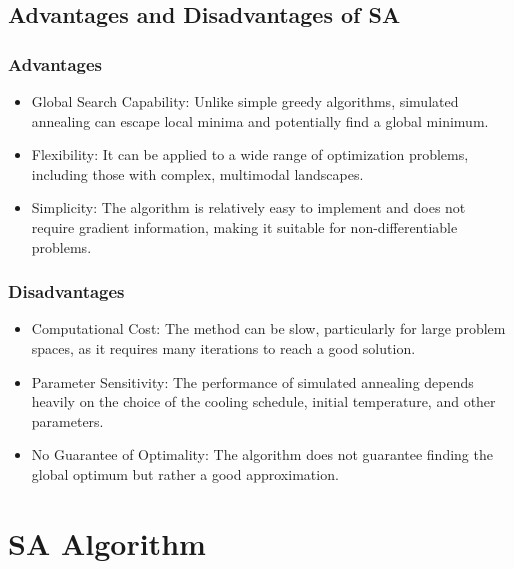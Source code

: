 \documentclass[
  letterpaper,
  DIV=11,
  numbers=noendperiod]{scrreprt}
\providecommand{\tightlist}{%
  \setlength{\itemsep}{0pt}\setlength{\parskip}{0pt}}\usepackage{longtable,booktabs,array}
\begin{document}
\section{Advantages and Disadvantages of
SA}\label{advantages-and-disadvantages-of-sa}

\subsection{Advantages}\label{advantages}

\begin{itemize}
\tightlist
\item
  Global Search Capability: Unlike simple greedy algorithms, simulated
  annealing can escape local minima and potentially find a global
  minimum.
\item
  Flexibility: It can be applied to a wide range of optimization
  problems, including those with complex, multimodal landscapes.
\item
  Simplicity: The algorithm is relatively easy to implement and does not
  require gradient information, making it suitable for
  non-differentiable problems.
\end{itemize}

\subsection{Disadvantages}\label{disadvantages}

\begin{itemize}
\tightlist
\item
  Computational Cost: The method can be slow, particularly for large
  problem spaces, as it requires many iterations to reach a good
  solution.
\item
  Parameter Sensitivity: The performance of simulated annealing depends
  heavily on the choice of the cooling schedule, initial temperature,
  and other parameters.
\item
  No Guarantee of Optimality: The algorithm does not guarantee finding
  the global optimum but rather a good approximation.
\end{itemize}


\chapter{SA Algorithm}\label{sa-algorithm-1}
\end{document}
